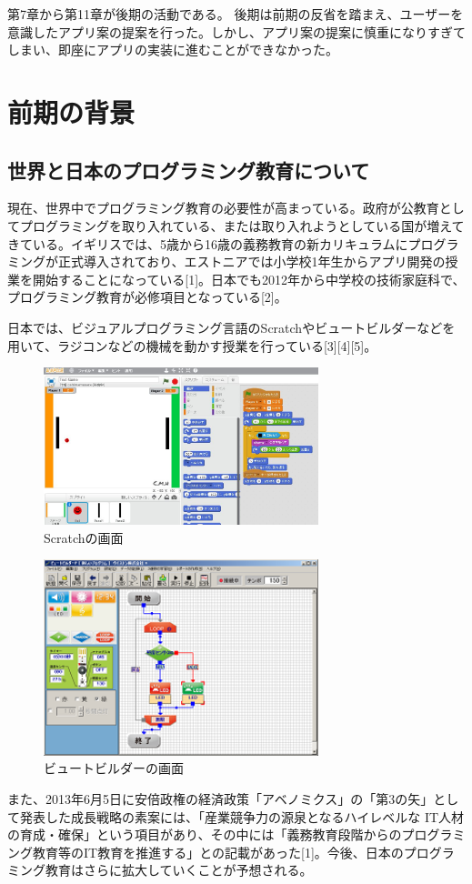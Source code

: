 \documentclass[openany,11pt,papersize]{jsbook}
\begin{document}
第7章から第11章が後期の活動である。
後期は前期の反省を踏まえ、ユーザーを意識したアプリ案の提案を行った。しかし、アプリ案の提案に慎重になりすぎてしまい、即座にアプリの実装に進むことができなかった。



\chapter{前期の背景}
\section{世界と日本のプログラミング教育について}
現在、世界中でプログラミング教育の必要性が高まっている。政府が公教育としてプログラミングを取り入れている、または取り入れようとしている国が増えてきている。イギリスでは、5歳から16歳の義務教育の新カリキュラムにプログラミングが正式導入されており、エストニアでは小学校1年生からアプリ開発の授業を開始することになっている[1]。日本でも2012年から中学校の技術家庭科で、プログラミング教育が必修項目となっている[2]。

日本では、ビジュアルプログラミング言語のScratchやビュートビルダーなどを用いて、ラジコンなどの機械を動かす授業を行っている[3][4][5]。
\begin{figure}[H]
\begin{center}
\includegraphics[width=8cm, bb=0 0 1306 780]{img/Scratch.jpg}
\end{center}
\caption{Scratchの画面}
\end{figure}



\begin{figure}[H]
\begin{center}
\includegraphics[width=8cm, bb=0 0 1006 770]{img/BeautoBuilderP_SSs.png}
\end{center}
\caption{ビュートビルダーの画面}
\end{figure}
また、2013年6月5日に安倍政権の経済政策「アベノミクス」の「第3の矢」として発表した成長戦略の素案には、「産業競争力の源泉となるハイレベルな IT人材の育成・確保」という項目があり、その中には「義務教育段階からのプログラミング教育等のIT教育を推進する」との記載があった[1]。今後、日本のプログラミング教育はさらに拡大していくことが予想される。
\end{document}
